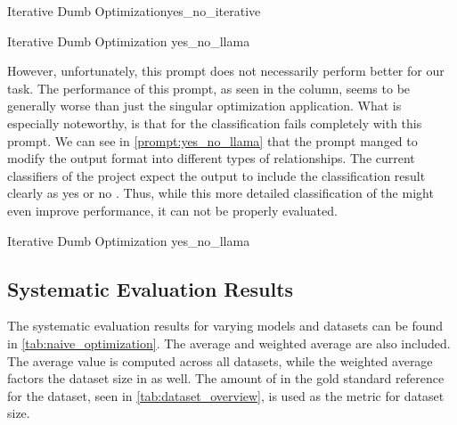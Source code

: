 \begin{prompt}{\KISS Iterative Dumb Optimization}{yes_no_iterative}
    \\
    
\begin{prompt}{\KISS Iterative Dumb Optimization \llama}{yes_no_llama}
    \\
    
\end{prompt}

However, unfortunately, this prompt does not necessarily perform better for our task.
The performance of this prompt, as seen in the  column, seems to be generally worse than just the singular optimization application.
What is especially noteworthy, is that for \llama the classification fails completely with this prompt.
We can see in \autoref{prompt:yes_no_llama} that the prompt manged to modify the output format into different types of relationships.
The current classifiers of the \LiSSA project expect the \LLM output to include the classification result clearly as \textquotesingle yes \textquotesingle or \textquotesingle no \textquotesingle.
Thus, while this more detailed classification of the \LLM might even improve performance, it can not be properly evaluated.

\begin{prompt}{\KISS Iterative Dumb Optimization \llama}{yes_no_llama}
    \\
    
\end{prompt}

\subsection{Systematic Evaluation Results}
\label{subsec:Evaluation:naive_optimization:systematic-evaluation-results}

The systematic evaluation results for varying models and datasets can be found in \autoref{tab:naive_optimization}.
The average and weighted average are also included.
The average value is computed across all datasets, while the weighted average factors the dataset size in as well.
The amount of \TLs in the gold standard reference for the dataset, seen in \autoref{tab:dataset_overview}, is used as the metric for dataset size.


\end{prompt}
